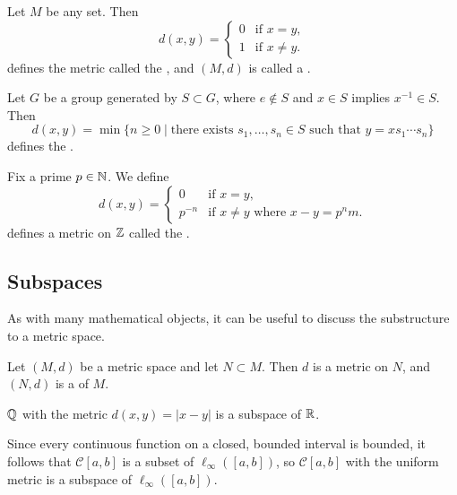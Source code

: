 \documentclass[a4paper]{scrartcl}
\begin{document}
\begin{example}
Let $M$ be any set. Then
$$
d(x, y) = \begin{cases}
    0 &\mbox{if } x = y, \\
    1 &\mbox{if } x \neq y.
   \end{cases}
$$
defines the metric called the , and $(M, d)$ is called a .
\end{example}

\begin{example}
    Let $G$ be a group generated by $S \subset G$, where $e \not \in S$ and $x \in S$ implies $x^{-1} \in S$. Then
    $$
    d(x, y) = \min \{n \geq 0 \mid \text{there exists } s_1, \dots, s_n \in S \text{ such that } y = x s_1 \cdots s_n \}
    $$
    defines the .
\end{example}

\begin{example}
    Fix a prime $p \in \mathbb{N}$. We define
    $$
    d(x, y) = \begin{cases}
        0 &\mbox{if } x = y, \\
        p^{-n} &\mbox{if } x \neq y \text{ where }x - y = p^n m.
       \end{cases}
    $$
    defines a metric on $\mathbb{Z}$ called the .
\end{example}

\subsection{Subspaces}

As with many mathematical objects, it can be useful to discuss the substructure to a metric space.

\begin{definition}[Subspace]
    Let $(M, d)$ be a metric space and let $N \subset M$. Then $d$ is a metric on $N$, and $(N, d)$ is a  of $M$.    
\end{definition}

\begin{example}[$\Q$ is a subspace of $\R$]
$\Q$ with the metric $d(x, y) = |x - y|$ is a subspace of $\R$.   
\end{example}

\begin{example}
    Since every continuous function on a closed, bounded interval is bounded, it follows that $\mathcal{C}[a, b]$ is a subset of $\ell_{\infty}([a, b])$, so $\mathcal{C}[a, b]$ with the uniform metric is a subspace of $\ell_{\infty}([a, b])$.
\end{example}
\end{document}
